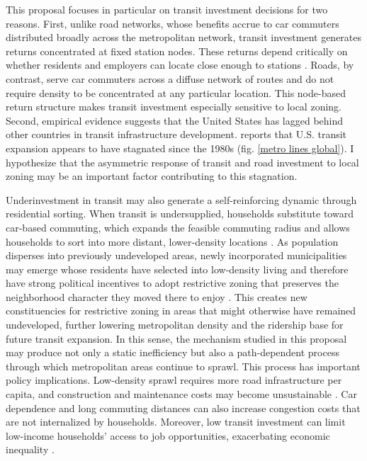 \documentclass[12pt, a4paper]{article}
\begin{document}
This proposal focuses in particular on transit investment decisions for two reasons. First, unlike road networks, whose benefits accrue to car commuters distributed broadly across the metropolitan network, transit investment generates returns concentrated at fixed station nodes. These returns depend critically on whether residents and employers can locate close enough to stations \citep{Hu2025-hj}. Roads, by contrast, serve car commuters across a diffuse network of routes and do not require density to be concentrated at any particular location. This node-based return structure makes transit investment especially sensitive to local zoning. Second, empirical evidence suggests that the United States has lagged behind other countries in transit infrastructure development. \cite{Freemark2023-jh} reports that U.S. transit expansion appears to have stagnated since the 1980s (fig. \ref{metro lines global}). I hypothesize that the asymmetric response of transit and road investment to local zoning may be an important factor contributing to this stagnation.

Underinvestment in transit may also generate a self-reinforcing dynamic through residential sorting. When transit is undersupplied, households substitute toward car-based commuting, which expands the feasible commuting radius and allows households to sort into more distant, lower-density locations \citep{Baum-Snow2007-zj}. As population disperses into previously undeveloped areas, newly incorporated municipalities may emerge whose residents have selected into low-density living and therefore have strong political incentives to adopt restrictive zoning that preserves the neighborhood character they moved there to enjoy \citep{Mast2024-zi}. This creates new constituencies for restrictive zoning in areas that might otherwise have remained undeveloped, further lowering metropolitan density and the ridership base for future transit expansion. In this sense, the mechanism studied in this proposal may produce not only a static inefficiency but also a path-dependent process through which metropolitan areas continue to sprawl. This process has important policy implications. Low-density sprawl requires more road infrastructure per capita, and construction and maintenance costs may become unsustainable \citep{Brueckner2000-vd}. Car dependence and long commuting distances can also increase congestion costs that are not internalized by households. Moreover, low transit investment can limit low-income households' access to job opportunities, exacerbating economic inequality \citep{Glaeser2008-xq}.
\end{document}

